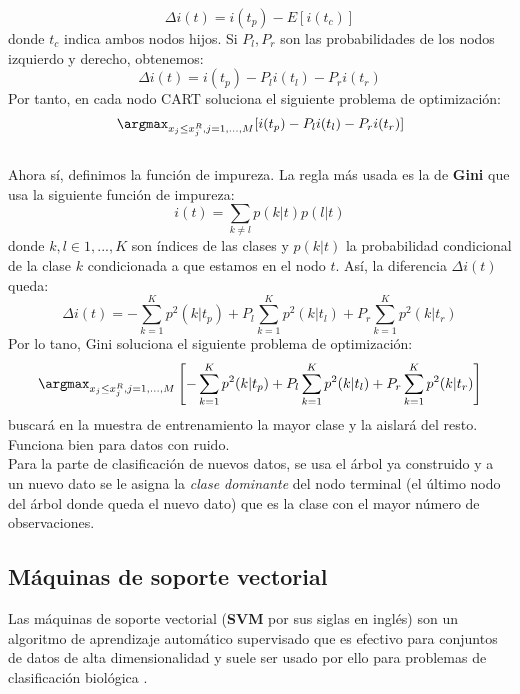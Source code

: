 \[ \Delta i(t) = i(t_{p})-E[i(t_{c})] \]
donde $t_{c}$ indica ambos nodos hijos. Si $P_{l},P_{r}$ son las probabilidades de los nodos izquierdo y derecho, obtenemos:
\[ \Delta i(t)= i(t_{p}) - P_{l} i(t_{l}) - P_{r} i(t_{r}) \]
Por tanto, en cada nodo CART soluciona el siguiente problema de optimización:
\[ \argmax_{x_{j} \leq x_{j}^{R},j=1,...,M}[i(t_{p}) - P_{l} i(t_{l}) - P_{r} i(t_{r})] \]
\cite{timofeev2004classification}\\
Ahora sí, definimos la función de impureza. La regla más usada es la de \textbf{Gini} que usa la siguiente función de impureza:
\[ i(t) = \sum_{k \neq l} p(k \vert t)p(l \vert t) \]
donde $k,l \in {1,...,K}$ son índices de las clases y $p(k \vert t)$ la probabilidad condicional de la clase $k$ condicionada a que estamos en el nodo $t$. Así, la diferencia $\Delta i(t)$ queda:
\[ \Delta i(t) = -\sum_{k=1}^{K} p^{2}(k \vert t_{p}) + P_{l} \sum_{k=1}^{K} p^{2}(k \vert t_{l}) + P_{r} \sum_{k=1}^{K}p^{2}(k \vert t_{r}) \]
Por lo tano, Gini soluciona el siguiente problema de optimización:
\[ \argmax_{x_{j} \leq x_{j}^{R},j=1,...,M} \left[ -\sum_{k=1}^{K} p^{2}(k \vert t_{p}) + P_{l} \sum_{k=1}^{K} p^{2}(k \vert t_{l}) + P_{r} \sum_{k=1}^{K}p^{2}(k \vert t_{r}) \right] \]
buscará en la muestra de entrenamiento la mayor clase y la aislará del resto. Funciona bien para datos con ruido.\\
Para la parte de clasificación de nuevos datos, se usa el árbol ya construido y a un nuevo dato se le asigna la \textit{clase dominante} del nodo terminal (el último nodo del árbol donde queda el nuevo dato) que es la clase con el mayor número de observaciones.\cite{timofeev2004classification}\\
\subsection{Máquinas de soporte vectorial}
Las máquinas de soporte vectorial (\textbf{SVM} por sus siglas en inglés) son un algoritmo de aprendizaje automático supervisado que es efectivo para conjuntos de datos de alta dimensionalidad y suele ser usado por ello para problemas de clasificación biológica \cite{10.1093/bioinformatics/btw498} \cite{cortes1995support}.\\















\endinput











